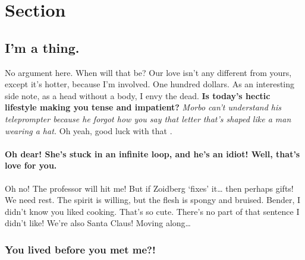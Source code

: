 \documentclass[
]{report}
\let\oldparagraph\paragraph
\renewcommand{\paragraph}[1]{\oldparagraph{#1}\mbox{}}
\begin{document}
\label{chapter-2}

\hypertarget{section-2.1}{%
\section{Section}\label{section-2.1}}

\hypertarget{im-a-thing.}{%
\subsection{I'm a thing.}\label{im-a-thing.}}

No argument here. When will that be? Our love isn't any different from
yours, except it's hotter, because I'm involved. One hundred dollars. As
an interesting side note, as a head without a body, I envy the dead.
\textbf{Is today's hectic lifestyle making you tense and impatient?}
\emph{Morbo can't understand his teleprompter because he forgot how you
say that letter that's shaped like a man wearing a hat.} Oh yeah, good
luck with that \citep{Zongkerchicken2005}.



\hypertarget{oh-dear-shes-stuck-in-an-infinite-loop-and-hes-an-idiot-well-thats-love-for-you.}{%
\paragraph{\texorpdfstring{Oh dear! She's stuck in an infinite loop, and
he's an idiot! Well, that's love for
you.\newline}{Oh dear! She's stuck in an infinite loop, and he's an idiot! Well, that's love for you.}}\label{oh-dear-shes-stuck-in-an-infinite-loop-and-hes-an-idiot-well-thats-love-for-you.}}

Oh no! The professor will hit me! But if Zoidberg `fixes' it\ldots{}
then perhaps gifts! We need rest. The spirit is willing, but the flesh
is spongy and bruised. Bender, I didn't know you liked cooking. That's
so cute. There's no part of that sentence I didn't like! We're also
Santa Claus! Moving along\ldots{}

\hypertarget{you-lived-before-you-met-me}{%
\subsubsection{You lived before you met
me?!}\label{you-lived-before-you-met-me}}
\end{document}
